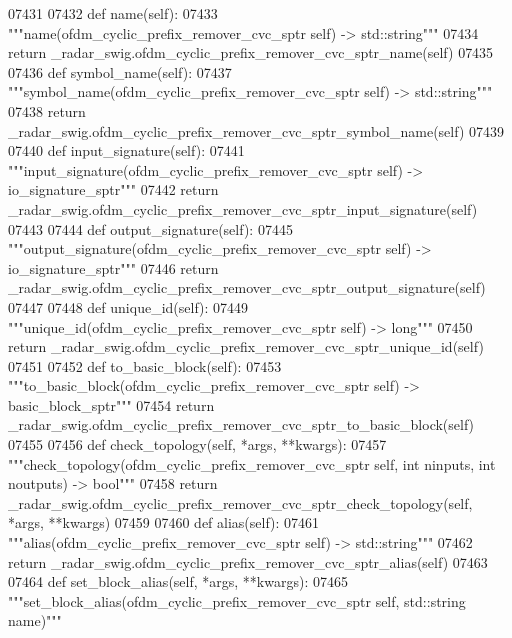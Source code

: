 \begin{DoxyCode}
{{{{{{{{{{{{{{{{{{{{{{{{07431 
07432     \textcolor{keyword}{def }name(self):
07433         \textcolor{stringliteral}{"""name(ofdm\_cyclic\_prefix\_remover\_cvc\_sptr self) -> std::string"""}
07434         \textcolor{keywordflow}{return} \_radar\_swig.ofdm\_cyclic\_prefix\_remover\_cvc\_sptr\_name(self)
07435 
07436     \textcolor{keyword}{def }symbol_name(self):
07437         \textcolor{stringliteral}{"""symbol\_name(ofdm\_cyclic\_prefix\_remover\_cvc\_sptr self) -> std::string"""}
07438         \textcolor{keywordflow}{return} \_radar\_swig.ofdm\_cyclic\_prefix\_remover\_cvc\_sptr\_symbol\_name(self)
07439 
07440     \textcolor{keyword}{def }input_signature(self):
07441         \textcolor{stringliteral}{"""input\_signature(ofdm\_cyclic\_prefix\_remover\_cvc\_sptr self) -> io\_signature\_sptr"""}
07442         \textcolor{keywordflow}{return} \_radar\_swig.ofdm\_cyclic\_prefix\_remover\_cvc\_sptr\_input\_signature(self)
07443 
07444     \textcolor{keyword}{def }output_signature(self):
07445         \textcolor{stringliteral}{"""output\_signature(ofdm\_cyclic\_prefix\_remover\_cvc\_sptr self) -> io\_signature\_sptr"""}
07446         \textcolor{keywordflow}{return} \_radar\_swig.ofdm\_cyclic\_prefix\_remover\_cvc\_sptr\_output\_signature(self)
07447 
07448     \textcolor{keyword}{def }unique_id(self):
07449         \textcolor{stringliteral}{"""unique\_id(ofdm\_cyclic\_prefix\_remover\_cvc\_sptr self) -> long"""}
07450         \textcolor{keywordflow}{return} \_radar\_swig.ofdm\_cyclic\_prefix\_remover\_cvc\_sptr\_unique\_id(self)
07451 
07452     \textcolor{keyword}{def }to_basic_block(self):
07453         \textcolor{stringliteral}{"""to\_basic\_block(ofdm\_cyclic\_prefix\_remover\_cvc\_sptr self) -> basic\_block\_sptr"""}
07454         \textcolor{keywordflow}{return} \_radar\_swig.ofdm\_cyclic\_prefix\_remover\_cvc\_sptr\_to\_basic\_block(self)
07455 
07456     \textcolor{keyword}{def }check_topology(self, *args, **kwargs):
07457         \textcolor{stringliteral}{"""check\_topology(ofdm\_cyclic\_prefix\_remover\_cvc\_sptr self, int ninputs, int noutputs) -> bool"""}
07458         \textcolor{keywordflow}{return} \_radar\_swig.ofdm\_cyclic\_prefix\_remover\_cvc\_sptr\_check\_topology(self, *args, **kwargs)
07459 
07460     \textcolor{keyword}{def }alias(self):
07461         \textcolor{stringliteral}{"""alias(ofdm\_cyclic\_prefix\_remover\_cvc\_sptr self) -> std::string"""}
07462         \textcolor{keywordflow}{return} \_radar\_swig.ofdm\_cyclic\_prefix\_remover\_cvc\_sptr\_alias(self)
07463 
07464     \textcolor{keyword}{def }set_block_alias(self, *args, **kwargs):
07465         \textcolor{stringliteral}{"""set\_block\_alias(ofdm\_cyclic\_prefix\_remover\_cvc\_sptr self, std::string name)"""}
}}}}}}}}}}}}}}}}}}}}}}}}
\end{DoxyCode}

